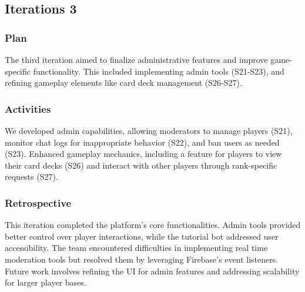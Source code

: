 \subsection{Iterations 3}

\subsubsection{Plan}
The third iteration aimed to finalize administrative features and improve game-specific functionality. This included implementing admin tools (S21-S23), and refining gameplay elements like card deck management (S26-S27).

\subsubsection{Activities}
We developed admin capabilities, allowing moderators to manage players (S21), monitor chat logs for inappropriate behavior (S22), and ban users as needed (S23). Enhanced gameplay mechanics, including a feature for players to view their card decks (S26) and interact with other players through rank-specific requests (S27). 
\subsubsection{Retrospective}
This iteration completed the platform’s core functionalities. Admin tools provided better control over player interactions, while the tutorial bot addressed user accessibility. The team encountered difficulties in implementing real time moderation tools but resolved them by leveraging Firebase’s event listeners. Future work involves refining the UI for admin features and addressing scalability for larger player bases.


